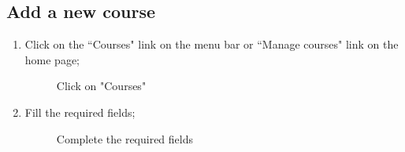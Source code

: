 \documentclass[ManualeUtente]{subfiles}
\begin{document}
	\subsection{Add a new course}
	\begin{enumerate}
		\item Click on the \textquotedblleft Courses" link on the menu bar or \textquotedblleft Manage courses" link on the home page;
		\begin{figure}[H]
			\centering
			\caption{Click on "Courses"}
			\label{fig:Click on "Courses"}
		\end{figure} \newpage
		\item Fill the required fields;
		\begin{figure}[H]
			\centering
			\caption{Complete the required fields}
			\label{fig:Complete the required fields}
		\end{figure}

\end{enumerate}
\end{document}
